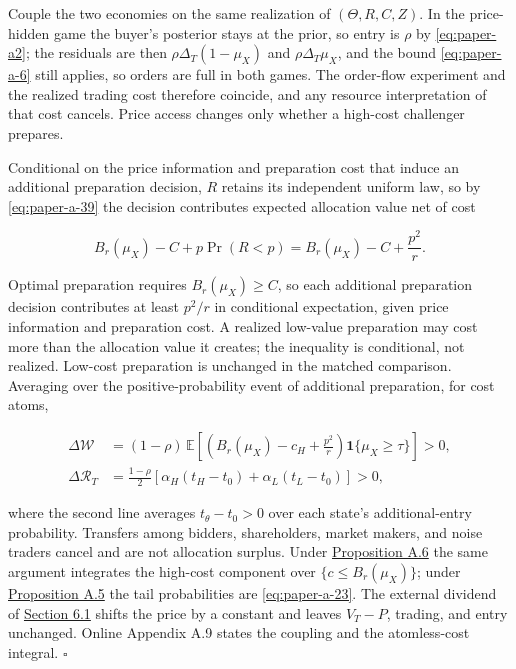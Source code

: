\documentclass[
  12pt,
]{article}
\begin{document}
Couple the two economies on the same realization of \((\Theta,R,C,Z)\).
In the price-hidden game the buyer's posterior stays at the prior, so
entry is \(\rho\) by \eqref{eq:paper-a2}; the residuals are then
\(\rho\Delta_T(1-\mu_X)\) and \(\rho\Delta_T\mu_X\), and the bound
\eqref{eq:paper-a-6} still applies, so orders are full in both games.
The order-flow experiment and the realized trading cost therefore
coincide, and any resource interpretation of that cost cancels. Price
access changes only whether a high-cost challenger prepares.

Conditional on the price information and preparation cost that induce an
additional preparation decision, \(R\) retains its independent uniform
law, so by \eqref{eq:paper-a-39} the decision contributes expected
allocation value net of cost

\[
B_r(\mu_X)-C+p\Pr(R<p)=B_r(\mu_X)-C+\frac{p^2}{r}.
\tag{A.40}\label{eq:paper-a-40}
\]

Optimal preparation requires \(B_r(\mu_X)\ge C\), so each additional
preparation decision contributes at least \(p^2/r\) in conditional
expectation, given price information and preparation cost. A realized
low-value preparation may cost more than the allocation value it
creates; the inequality is conditional, not realized. Low-cost
preparation is unchanged in the matched comparison. Averaging over the
positive-probability event of additional preparation, for cost atoms,

\[
\begin{aligned}
\Delta\mathcal W&=(1-\rho)\,\mathbb E\left[
\left(B_r(\mu_X)-c_H+\frac{p^2}{r}\right)\mathbf1\{\mu_X\ge\tau\}\right]>0,\\
\Delta\mathcal R_T&=\frac{1-\rho}{2}
\left[\alpha_H(t_H-t_0)+\alpha_L(t_L-t_0)\right]>0,
\end{aligned}
\tag{A.41}\label{eq:paper-a-41}
\]

where the second line averages \(t_\theta-t_0>0\) over each state's
additional-entry probability. Transfers among bidders, shareholders,
market makers, and noise traders cancel and are not allocation surplus.
Under \hyperref[result-proposition-a-6]{Proposition A.6} the same
argument integrates the high-cost component over
\(\{c\le B_r(\mu_X)\}\); under
\hyperref[result-proposition-a-5]{Proposition A.5} the tail
probabilities are \eqref{eq:paper-a-23}. The external dividend of
\hyperref[sec-access-to-prices]{Section 6.1} shifts the price by a
constant and leaves \(V_T-P\), trading, and entry unchanged. Online
Appendix A.9 states the coupling and the atomless-cost integral.
\(\square\)
\end{document}
